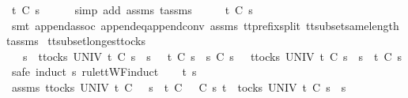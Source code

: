 \begin{isabellebody}
\ {\isachardoublequoteopen}t{\isacharprime}\ {\isasymle}\isactrlsub C\ s{}{\isachardoublequoteclose}\isanewline
\ \ \ \ \isamarkupfalse%
\ {\isacharparenleft}simp\ add{\isacharcolon}\ assms{\isacharparenleft}{}{\isacharparenright}\ t{\isacharprime}{\isacharunderscore}assms{\isacharparenright}\isanewline
\ \ \isamarkupfalse%
\ \isamarkupfalse%
\ {\isachardoublequoteopen}t\ {\isasymle}\isactrlsub C\ s{}{\isachardoublequoteclose}\isanewline
\ \ \ \ \isamarkupfalse%
\ {\isacharparenleft}smt\ append{\isacharunderscore}assoc\ append{\isacharunderscore}eq{\isacharunderscore}append{\isacharunderscore}conv\ assms{\isacharparenleft}{}{\isacharparenright}\ tt{\isacharunderscore}prefix{\isacharunderscore}split\ tt{\isacharunderscore}subset{\isacharunderscore}same{\isacharunderscore}length\ t{\isacharprime}{\isacharunderscore}assms{\isacharparenright}\isanewline
{}\isamarkupfalse%
%
\endisatagproof
{\isafoldproof}%
%
\isadelimproof
\isanewline
%
\endisadelimproof
\isanewline
{}\isamarkupfalse%
\ tt{\isacharunderscore}subset{\isacharunderscore}longest{\isacharunderscore}tocks{}{\isacharcolon}\isanewline
\ \ {\isachardoublequoteopen}{\isasymAnd}\ s{}{\isacharprime}{\isachardot}\ {\isasymforall}\ t{\isasymin}tocks\ UNIV{\isachardot}\ t\ {\isasymle}\isactrlsub C\ s{}\ {\isacharat}\ s{}\ \ {\isasymlongrightarrow}\ t\ {\isasymle}\isactrlsub C\ s{}\ {\isasymLongrightarrow}\ s{}\ {\isasymsubseteq}\isactrlsub C\ s{}{\isacharprime}\ {\isasymLongrightarrow}\ {\isasymforall}\ t{\isasymin}tocks\ UNIV{\isachardot}\ t\ {\isasymle}\isactrlsub C\ s{}{\isacharprime}\ {\isacharat}\ s{}\ {\isasymlongrightarrow}\ t\ {\isasymle}\isactrlsub C\ s{}{\isacharprime}{\isachardoublequoteclose}\isanewline
%
\isadelimproof
%
\endisadelimproof
%
\isatagproof
{}\isamarkupfalse%
\ {\isacharparenleft}safe{\isacharcomma}\ induct\ s{}\ rule{\isacharcolon}ttWF{\isachardot}induct{\isacharparenright}\isanewline
\ \ \isamarkupfalse%
\ t\ s{}{\isacharprime}\isanewline
\ \ \isamarkupfalse%
\ assms{\isacharcolon}\ {\isachardoublequoteopen}{\isasymforall}t{\isasymin}tocks\ UNIV{\isachardot}\ t\ {\isasymle}\isactrlsub C\ {\isacharbrackleft}{\isacharbrackright}\ {\isacharat}\ s{}\ {\isasymlongrightarrow}\ t\ {\isasymle}\isactrlsub C\ {\isacharbrackleft}{\isacharbrackright}{\isachardoublequoteclose}\ {\isachardoublequoteopen}{\isacharbrackleft}{\isacharbrackright}\ {\isasymsubseteq}\isactrlsub C\ s{}{\isacharprime}{\isachardoublequoteclose}\ {\isachardoublequoteopen}t\ {\isasymin}\ tocks\ UNIV{\isachardoublequoteclose}\ {\isachardoublequoteopen}t\ {\isasymle}\isactrlsub C\ s{}{\isacharprime}\ {\isacharat}\ s{}{\isachardoublequoteclose}\isanewline

\end{isabellebody}

